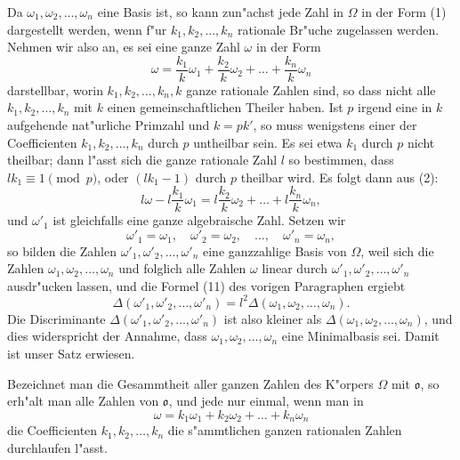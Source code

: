 \documentclass[12pt,a4paper]{article}
\theoremstyle{definition}
\begin{document}
Da $\omega_1, \omega_2, \dots, \omega_n$ eine Basis ist, so kann zun"achst jede Zahl in $\Omega$ in der Form (1) dargestellt werden, wenn f"ur $k_1, k_2, \dots, k_n$ rationale Br"uche zugelassen werden. Nehmen wir also an, es sei eine ganze Zahl $\omega$ in der Form
\begin{equation}
\omega = \frac{k_1}{k}\omega_1 + \frac{k_2}{k}\omega_2 + \dots + \frac{k_n}{k}\omega_n
\end{equation}
darstellbar, worin $k_1, k_2, \dots, k_n, k$ ganze rationale Zahlen sind, so dass nicht alle $k_1, k_2, \dots, k_n$ mit $k$ einen gemeinschaftlichen Theiler haben. Ist $p$ irgend eine in $k$ aufgehende nat"urliche Primzahl und $k = pk'$, so muss wenigstens einer der Coefficienten $k_1, k_2, \dots, k_n$ durch $p$ untheilbar sein. Es sei etwa $k_1$ durch $p$ nicht theilbar; dann l"asst sich die ganze rationale Zahl $l$ so bestimmen, dass $lk_1 \equiv 1 \pmod{p}$, oder $(lk_1 - 1)$ durch $p$ theilbar wird. Es folgt dann aus (2):
\begin{equation}
l\omega - l\frac{k_1}{k}\omega_1 = l\frac{k_2}{k}\omega_2 + \dots + l\frac{k_n}{k}\omega_n,
\end{equation}
und $\omega'_1$ ist gleichfalls eine ganze algebraische Zahl. Setzen wir
\begin{equation}
\omega'_1 = \omega_1, \quad \omega'_2 = \omega_2, \quad \dots, \quad \omega'_n = \omega_n,
\end{equation}
so bilden die Zahlen $\omega'_1, \omega'_2, \dots, \omega'_n$ eine ganzzahlige Basis von $\Omega$, weil sich die Zahlen $\omega_1, \omega_2, \dots, \omega_n$ und folglich alle Zahlen $\omega$ linear durch $\omega'_1, \omega'_2, \dots, \omega'_n$ ausdr"ucken lassen, und die Formel (11) des vorigen Paragraphen ergiebt
\begin{equation}
\Delta(\omega'_1, \omega'_2, \dots, \omega'_n) = l^2 \Delta(\omega_1, \omega_2, \dots, \omega_n).
\end{equation}
Die Discriminante $\Delta(\omega'_1, \omega'_2, \dots, \omega'_n)$ ist also kleiner als $\Delta(\omega_1, \omega_2, \dots, \omega_n)$, und dies widerspricht der Annahme, dass $\omega_1, \omega_2, \dots, \omega_n$ eine Minimalbasis sei. Damit ist unser Satz erwiesen.

Bezeichnet man die Gesammtheit aller ganzen Zahlen des K"orpers $\Omega$ mit $\mathfrak{o}$, so erh"alt man alle Zahlen von $\mathfrak{o}$, und jede nur einmal, wenn man in
\begin{equation}
\omega = k_1\omega_1 + k_2\omega_2 + \dots + k_n\omega_n
\end{equation}
die Coefficienten $k_1, k_2, \dots, k_n$ die s"ammtlichen ganzen rationalen Zahlen durchlaufen l"asst.
\end{document}
